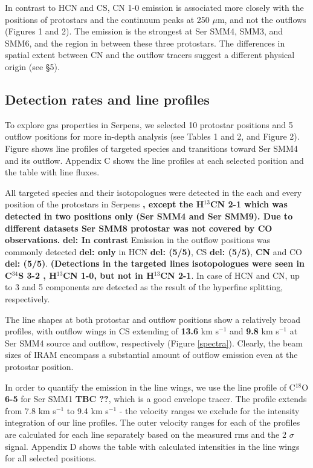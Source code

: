 \documentclass{aa}
\begin{document}
In contrast to HCN and CS, CN 1-0 emission is associated more closely with the positions of protostars
and the continuum peaks at 250 $\mu$m, and not the outflows (Figures 1 and 2). The emission is the strongest at
Ser SMM4, SMM3, and SMM6, and the region in between these three protostars. The differences in 
spatial extent between CN and the outflow tracers suggest a different physical origin (see \S 5).

\subsection{Detection rates and line profiles}
To explore gas properties in Serpens, we selected 10 protostar positions and 5 
outflow positions for more in-depth analysis (see Tables 1 and 2, and Figure 2). Figure \label{spectra} shows 
line profiles of targeted species and transitions toward Ser SMM4 and its outflow. Appendix 
C shows the line profiles at each selected position and the table with line fluxes. 

All targeted species and their isotopologues were detected in the each and every position 
of the protostars in Serpens \textbf{, except the H$^{13}$CN 2-1 which was detected in two positions only (Ser SMM4 and Ser SMM9). Due to different datasets Ser SMM8 protostar was not covered by CO observations.} \textbf{del: In contrast} Emission in the outflow 
positions was commonly detected \textbf{del: only} in HCN \textbf{ del: (5/5)}, CS \textbf{ del: (5/5)}, \textbf{CN} and CO \textbf{ del: (5/5)}. \textbf{(Detections in the targeted lines isotopologues were seen in C$^{34}$S 3-2 , H$^{13}$CN 1-0, but not in H$^{13}$CN 2-1}. 
In case of HCN and CN, up to 3 and 5 components are detected as the result of the hyperfine splitting, respectively. 

The line shapes at both protostar and outflow positions show a relatively broad profiles, 
with outflow wings in CS extending of \textbf{13.6} km s$^{-1}$ and \textbf{9.8} km s$^{-1}$ at Ser SMM4 
source and outflow, respectively (Figure \ref{spectra}). Clearly, the beam sizes of 
IRAM encompass a substantial amount of outflow emission even at the protostar position. 

In order to quantify the emission in the line wings, we use the line profile of C$^{18}$O \textbf{6-5}
for Ser SMM1 \textbf{TBC ??}, which is a good envelope tracer. The profile extends from 
7.8 km s$^{-1}$ to 9.4 km s$^{-1}$ - the velocity ranges we exclude for the intensity integration of our line profiles. The outer velocity ranges for each of the profiles are calculated 
for each line separately based on the measured rms and the 2 $\sigma$ signal. Appendix D 
shows the table with calculated intensities in the line wings for all selected positions.
\end{document}
